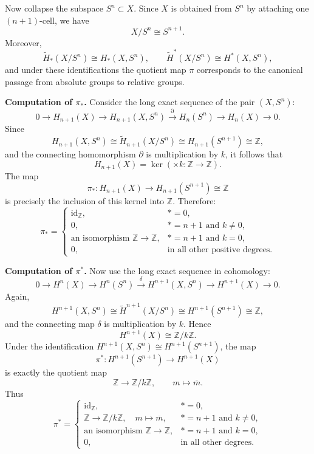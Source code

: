 \documentclass[12pt,a4paper]{article}
\theoremstyle{notespace}
\begin{document}
Now collapse the subspace \(S^n\subset X\). Since \(X\) is obtained from \(S^n\) by attaching one \((n+1)\)-cell, we have
\[
X/S^n\cong S^{n+1}.
\]
Moreover,
\[
\widetilde H_*(X/S^n)\cong H_*(X,S^n),
\qquad
\widetilde H^*(X/S^n)\cong H^*(X,S^n),
\]
and under these identifications the quotient map \(\pi\) corresponds to the canonical passage from absolute groups to relative groups.

\medskip

\textbf{Computation of \(\pi_*\).}
Consider the long exact sequence of the pair \((X,S^n)\):
\[
0\to H_{n+1}(X)\to H_{n+1}(X,S^n)\xrightarrow{\partial} H_n(S^n)\to H_n(X)\to 0.
\]
Since
\[
H_{n+1}(X,S^n)\cong \widetilde H_{n+1}(X/S^n)\cong H_{n+1}(S^{n+1})\cong \mathbb Z,
\]
and the connecting homomorphism \(\partial\) is multiplication by \(k\), it follows that
\[
H_{n+1}(X)=\ker(\times k:\mathbb Z\to\mathbb Z).
\]
The map
\[
\pi_*:H_{n+1}(X)\to H_{n+1}(S^{n+1})\cong \mathbb Z
\]
is precisely the inclusion of this kernel into \(\mathbb Z\). Therefore:
\[
\pi_*=
\begin{cases}
	\mathrm{id}_{\mathbb Z}, & *=0,\\[1mm]
	0, & *=n+1 \text{ and } k\neq 0,\\[1mm]
	\text{an isomorphism }\mathbb Z\to\mathbb Z, & *=n+1 \text{ and } k=0,\\[1mm]
	0, & \text{in all other positive degrees.}
\end{cases}
\]

\medskip

\textbf{Computation of \(\pi^*\).}
Now use the long exact sequence in cohomology:
\[
0\to H^n(X)\to H^n(S^n)\xrightarrow{\delta} H^{n+1}(X,S^n)\to H^{n+1}(X)\to 0.
\]
Again,
\[
H^{n+1}(X,S^n)\cong \widetilde H^{n+1}(X/S^n)\cong H^{n+1}(S^{n+1})\cong \mathbb Z,
\]
and the connecting map \(\delta\) is multiplication by \(k\). Hence
\[
H^{n+1}(X)\cong \mathbb Z/k\mathbb Z.
\]
Under the identification \(H^{n+1}(X,S^n)\cong H^{n+1}(S^{n+1})\), the map
\[
\pi^*:H^{n+1}(S^{n+1})\to H^{n+1}(X)
\]
is exactly the quotient map
\[
\mathbb Z\to \mathbb Z/k\mathbb Z,
\qquad
m\mapsto \overline{m}.
\]
Thus
\[
\pi^*=
\begin{cases}
	\mathrm{id}_{\mathbb Z}, & *=0,\\[1mm]
	\mathbb Z\to \mathbb Z/k\mathbb Z,\quad m\mapsto \overline{m}, & *=n+1 \text{ and } k\neq 0,\\[1mm]
	\text{an isomorphism }\mathbb Z\to\mathbb Z, & *=n+1 \text{ and } k=0,\\[1mm]
	0, & \text{in all other degrees.}
\end{cases}
\]
\end{document}
